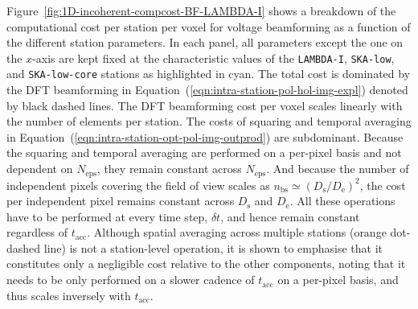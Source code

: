 \documentclass[
  journal=pasa,
  manuscript=article-type,
  year=2020,
  volume=37,
]{cup-journal}
\begin{document}
Figure~\ref{fig:1D-incoherent-compcost-BF-LAMBDA-I} shows a breakdown of the computational cost per station per voxel for voltage beamforming as a function of the different station parameters. In each panel, all parameters except the one on the $x$-axis are kept fixed at the characteristic values of the \texttt{LAMBDA-I}, \texttt{SKA-low}, and \texttt{SKA-low-core} stations as highlighted in cyan. The total cost is dominated by the DFT beamforming in Equation~(\ref{eqn:intra-station-pol-hol-img-expl}) denoted by black dashed lines. The DFT beamforming cost per voxel scales linearly with the number of elements per station. The costs of squaring and temporal averaging in Equation~(\ref{eqn:intra-station-opt-pol-img-outprod}) are subdominant. Because the squaring and temporal averaging are performed on a per-pixel basis and not dependent on $N_\textrm{eps}$, they remain constant across $N_\textrm{eps}$. And because the number of independent pixels covering the field of view scales as $n_\textrm{bs} \simeq (D_\textrm{s}/D_\textrm{e})^2$, the cost per independent pixel remains constant across $D_\textrm{s}$ and $D_\textrm{e}$. All these operations have to be performed at every time step, $\delta t$, and hence remain constant regardless of $t_\textrm{acc}$. Although spatial averaging across multiple stations (orange dot-dashed line) is not a station-level operation, it is shown to emphasise that it constitutes only a negligible cost relative to the other components, noting that it needs to be only performed on a slower cadence of $t_\textrm{acc}$ on a per-pixel basis, and thus scales inversely with $t_\textrm{acc}$.
\end{document}
